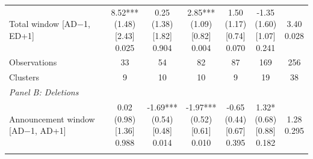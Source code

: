 \begin{threeparttable}
\begin{tabular}{@{}lcccccc}
Total window [AD$-$1, ED+1] & \makecell{8.52***\\(1.48)\\{}[2.43]\\{0.025}} & \makecell{0.25\\(1.38)\\{}[1.82]\\{0.904}} & \makecell{2.85***\\(1.09)\\{}[0.82]\\{0.004}} & \makecell{1.50\\(1.17)\\{}[0.74]\\{0.070}} & \makecell{-1.35\\(1.60)\\{}[1.07]\\{0.241}} & \makecell{3.40\\{0.028}} \\
\addlinespace[0.25ex]
\addlinespace[0.25ex]
Observations & 33 & 54 & 82 & 87 & 169 & 256 \\
\addlinespace[0.25ex]
\addlinespace[0.25ex]
Clusters & 9 & 10 & 10 & 9 & 19 & 38 \\
\addlinespace[0.25ex]
\midrule
\emph{Panel B: Deletions} \\
\addlinespace[0.25ex]
\addlinespace[1ex]
Announcement window [AD$-$1, AD+1] & \makecell{0.02\\(0.98)\\{}[1.36]\\{0.988}} & \makecell{-1.69***\\(0.54)\\{}[0.48]\\{0.014}} & \makecell{-1.97***\\(0.52)\\{}[0.61]\\{0.010}} & \makecell{-0.65\\(0.44)\\{}[0.67]\\{0.395}} & \makecell{1.32*\\(0.68)\\{}[0.88]\\{0.182}} & \makecell{1.28\\{0.295}} \\
\addlinespace[0.25ex]
\addlinespace[0.25ex]

\end{tabular}
\end{threeparttable}
